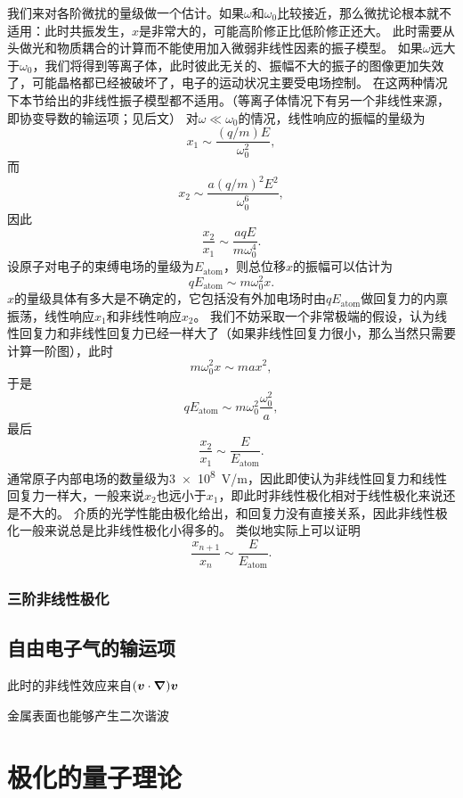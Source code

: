 \documentclass[UTF8, a4paper]{ctexart}
\begin{document}
我们来对各阶微扰的量级做一个估计。如果$\omega$和$\omega_0$比较接近，那么微扰论根本就不适用：此时共振发生，$x$是非常大的，可能高阶修正比低阶修正还大。
此时需要从头做光和物质耦合的计算而不能使用加入微弱非线性因素的振子模型。
如果$\omega$远大于$\omega_0$，我们将得到等离子体，此时彼此无关的、振幅不大的振子的图像更加失效了，可能晶格都已经被破坏了，电子的运动状况主要受电场控制。
在这两种情况下本节给出的非线性振子模型都不适用。（等离子体情况下有另一个非线性来源，即协变导数的输运项；见后文）
对$\omega \ll \omega_0$的情况，线性响应的振幅的量级为
\[
    x_1 \sim \frac{(q/m) E}{\omega_0^2},
\]
而
\[
    x_2 \sim \frac{a (q/m)^2 E^2}{\omega_0^6},
\]
因此
\begin{equation}
    \frac{x_2}{x_1} \sim \frac{a q E}{m \omega_0^4}.
\end{equation}
设原子对电子的束缚电场的量级为$E_\text{atom}$，则总位移$x$的振幅可以估计为
\[
    q E_\text{atom} \sim m \omega_0^2 x .
\]
$x$的量级具体有多大是不确定的，它包括没有外加电场时由$q E_\text{atom}$做回复力的内禀振荡，线性响应$x_1$和非线性响应$x_2$。
我们不妨采取一个非常极端的假设，认为线性回复力和非线性回复力已经一样大了（如果非线性回复力很小，那么当然只需要计算一阶图），此时
\[
    m \omega_0^2 x \sim m a x^2,
\]
于是
\[
    q E_\text{atom} \sim m \omega_0^2 \frac{\omega_0^2}{a},
\]
最后
\begin{equation}
    \frac{x_2}{x_1} \sim \frac{E}{E_\text{atom}}.
\end{equation}
通常原子内部电场的数量级为\SI{3e8}{V/m}，因此即使认为非线性回复力和线性回复力一样大，一般来说$x_2$也远小于$x_1$，即此时非线性极化相对于线性极化来说还是不大的。
介质的光学性能由极化给出，和回复力没有直接关系，因此非线性极化一般来说总是比非线性极化小得多的。
类似地实际上可以证明
\begin{equation}
    \frac{x_{n+1}}{x_n} \sim \frac{E}{E_\text{atom}}.
\end{equation}

\subsubsection{三阶非线性极化}

\subsection{自由电子气的输运项}

此时的非线性效应来自$(\vb*{v} \cdot \grad) \vb*{v}$

金属表面也能够产生二次谐波

\section{极化的量子理论}
\end{document}

